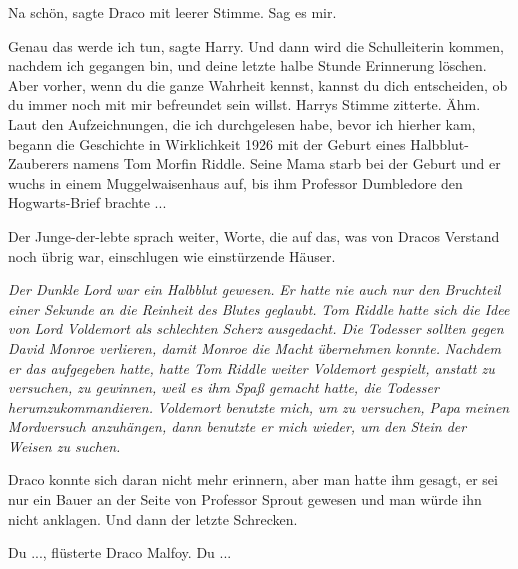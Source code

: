 \glqq{}Na schön\grqq{}, sagte Draco mit leerer Stimme. \glqq{}Sag es mir.\grqq{}

\glqq{}Genau das werde ich tun\grqq{}, sagte Harry. \glqq{}Und dann wird die
Schulleiterin kommen, nachdem ich gegangen bin, und deine letzte halbe Stunde
Erinnerung löschen. Aber vorher, wenn du die ganze Wahrheit kennst, kannst du
dich entscheiden, ob du immer noch mit mir befreundet sein willst.\grqq{} Harrys
Stimme zitterte. \glqq{}Ähm. Laut den Aufzeichnungen, die ich durchgelesen habe,
bevor ich hierher kam, begann die Geschichte in Wirklichkeit 1926 mit der Geburt
eines Halbblut-Zauberers namens Tom Morfin Riddle. Seine Mama starb bei der
Geburt und er wuchs in einem Muggelwaisenhaus auf, bis ihm Professor Dumbledore
den Hogwarts-Brief brachte ...\grqq{}

Der Junge-der-lebte sprach weiter, Worte, die auf das, was von Dracos Verstand
noch übrig war, einschlugen wie einstürzende Häuser.

\emph{Der Dunkle Lord war ein Halbblut gewesen.}
\emph{Er hatte nie auch nur den Bruchteil einer Sekunde an die Reinheit des
Blutes geglaubt.} \emph{Tom Riddle hatte sich die Idee von Lord Voldemort als
schlechten Scherz ausgedacht. Die Todesser sollten gegen David Monroe verlieren,
damit Monroe die Macht übernehmen konnte.} \emph{Nachdem er das aufgegeben
hatte, hatte Tom Riddle weiter Voldemort gespielt, anstatt zu versuchen, zu
gewinnen, weil es ihm Spaß gemacht hatte, die Todesser herumzukommandieren.}
\emph{Voldemort benutzte mich, um zu versuchen, Papa meinen Mordversuch
anzuhängen, dann benutzte er mich wieder, um den Stein der Weisen zu suchen.}

Draco konnte sich daran nicht mehr erinnern, aber man hatte ihm gesagt, er sei
nur ein Bauer an der Seite von Professor Sprout gewesen und man würde ihn nicht
anklagen. Und dann der letzte Schrecken.

\glqq{}Du ...\grqq{}, flüsterte Draco Malfoy. \glqq{}Du ...\grqq{}

